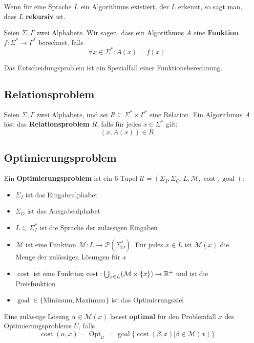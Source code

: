 \begin{definition}
Wenn für eine Sprache $L$ ein Algorithmus existiert, der $L$ erkennt, so sagt man, dass $L$ \textbf{rekursiv} ist.\\
\end{definition}


\begin{definition}
Seien $\Sigma, \Gamma$ zwei Alphabete. Wir sagen, dass ein Algorithmus $A$ eine \textbf{Funktion $f: \Sigma^* \to \Gamma^*$} berechnet, falls
\[
\forall x \in \Sigma^*: A(x) = f(x)
\]
\end{definition}

Das Entscheidungsproblem ist ein Spezialfall einer Funktionsberechnung.

\subsection{Relationsproblem}
\begin{definition}
Seien $\Sigma, \Gamma$ zwei Alphabete, und sei $R \subseteq \Sigma^* \times \Gamma^*$ eine Relation. Ein Algorithmus $A$ löst das \textbf{Relationsproblem} $R$, falls für jedes $x \in \Sigma^*$ gilt:
\[
(x, A(x)) \in R
\]
\end{definition}

\subsection{Optimierungsproblem}
\begin{definition}
Ein \textbf{Optimierungsproblem} ist ein 6-Tupel $\mathcal{U} = (\Sigma_I, \Sigma_O, L, \mathcal{M}, \operatorname{cost}, \operatorname{goal})$:
\begin{itemize}
  \item $\Sigma_I$ ist das Eingabealphabet
  \item $\Sigma_O$ ist das Ausgabealphabet
  \item $L \subseteq \Sigma_I^*$ ist die Sprache der zulässigen Eingaben
  \item $\mathcal{M}$ ist eine Funktion $\mathcal{M}: L \to \mathcal{P}(\Sigma_O^*)$. Für jedes $x \in L$ ist $\mathcal{M}(x)$ die Menge der zulässigen Lösungen für $x$
  \item $\operatorname{cost}$ ist eine Funktion $\operatorname{cost}: \bigcup_{x \in L}(\mathcal{M} \times \{x\}) \to \mathbb{R}^+$ und ist die Preisfunktion
  \item $\operatorname{goal} \in \{\text{Minimum}, \text{Maximum}\}$ ist das Optimierungsziel
\end{itemize}

Eine zulässige Lösung $\alpha \in \mathcal{M}(x)$ heisst \textbf{optimal} für den Problemfall $x$ des Optimierungsproblems $U$, falls
\[
\operatorname{cost}(\alpha, x) = \operatorname{Opt}_\mathcal{U} = \operatorname{goal}\{\operatorname{cost}(\beta, x) | \beta \in \mathcal{M}(x)\}
\]\\
\end{definition}

